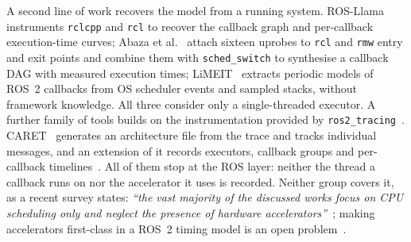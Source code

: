 A second line of work recovers the model from a running system.
ROS-Llama~\cite{blass-2021-rosllama-paper} instruments \texttt{rclcpp} and
\texttt{rcl} to recover the callback graph and per-callback execution-time
curves; Abaza et al.~\cite{abaza-2024-ros2modelsynthesis} attach sixteen uprobes
to \texttt{rcl} and \texttt{rmw} entry and exit points and combine them with
\texttt{sched\_switch} to synthesise a callback DAG with measured execution
times; LiMEIT~\cite{brandenburg-2026-limeit} extracts periodic models of ROS~2
callbacks from OS scheduler events and sampled stacks, without framework
knowledge. All three consider only a single-threaded executor. A further family
of tools builds on the instrumentation provided by
\texttt{ros2\_tracing}~\cite{bedard-2022-ros2tracing}.
CARET~\cite{kuboichi-2022-caret} generates an architecture file from the trace
and tracks individual messages, and an extension of it records executors,
callback groups and per-callback timelines~\cite{peng-2022-caretcomp}. All of
them stop at the ROS layer: neither the thread a callback runs on nor the
accelerator it uses is recorded. Neither group covers it, as a recent survey
states: \textit{``the vast majority of the discussed works focus on CPU
scheduling only and neglect the presence of hardware
accelerators''}~\cite{casini-2025-surveyros2}; making accelerators first-class
in a ROS~2 timing model is an open
problem~\cite{yano-2026-rightanalyticalmodelsoftware}.
